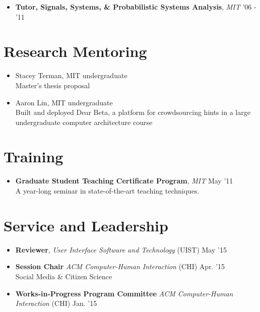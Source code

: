 \documentclass[margin]{res}
\begin{document}
\begin{resume}
\begin{itemize}[leftmargin=*]
\item {\bf Tutor, Signals, Systems, \& Probabilistic Systems Analysis}, {\it MIT} \hfill '06 - '11 %
\end{itemize}

\section{Research Mentoring}
\begin{itemize}[leftmargin=*] 
\item Stacey Terman, MIT undergraduate\\
Master's thesis proposal
\item Aaron Lin, MIT undergraduate\\
Built and deployed Dear Beta, a platform for crowdsourcing hints in a large undergraduate computer architecture course
\end{itemize}

\section{Training}
\begin{itemize}[leftmargin=*]
\item {\bf Graduate Student Teaching Certificate Program}, {\it MIT} \hfill May '11 \\ A year-long seminar in state-of-the-art teaching techniques.
\end{itemize}

\section{Service and Leadership}

                \begin{itemize}[leftmargin=*] %
\item {\bf Reviewer}, {\it User Interface Software and Technology} (UIST) \hfill May '15 
\item {\bf Session Chair} {\it ACM Computer-Human Interaction} (CHI) \hfill Apr. '15 \\
Social Media \& Citizen Science
\item {\bf Works-in-Progress Program Committee} {\it ACM Computer-Human Interaction} (CHI)  \hfill Jan. '15 



\end{itemize}
\end{resume}
\end{document}
